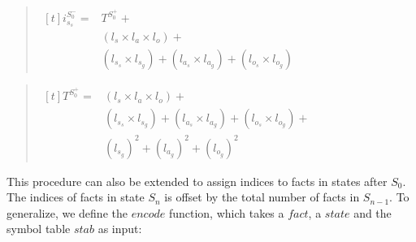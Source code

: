 \documentclass[10pt, twocolumn]{article}
\begin{document}
          \begin{quote}
            \begin{math}
              \begin{aligned}[t]
                i^{S^{-}_{0}}_{s_{s}} = & T^{S^{+}_{0}} + \\
                & (l_{s} \times l_{a} \times l_{o}) + \\
                & (l_{s_{s}} \times l_{s_{g}}) + (l_{a_{s}} \times l_{a_{g}}) + (l_{o_{s}} \times l_{o_{g}})
              \end{aligned}
            \end{math}
          \end{quote}
          \begin{quote}
            \begin{math}
              \begin{aligned}[t]
                T^{S^{+}_{0}} = & (l_{s} \times l_{a} \times l_{o}) + \\
                & (l_{s_{s}} \times l_{s_{g}}) + (l_{a_{s}} \times l_{a_{g}}) + (l_{o_{s}} \times l_{o_{g}}) + \\
                & (l_{s_{g}})^{2} + (l_{a_{g}})^{2} + (l_{o_{g}})^{2}
              \end{aligned}
            \end{math}
          \end{quote}

          This procedure can also be extended to assign indices to facts in
          states after $S_{0}$. The indices of facts in state $S_{n}$ is offset
          by the total number of facts in $S_{n - 1}$. To generalize, we define
          the $encode$ function, which takes a $fact$, a $state$ and the symbol
          table $stab$ as input:
\end{document}
